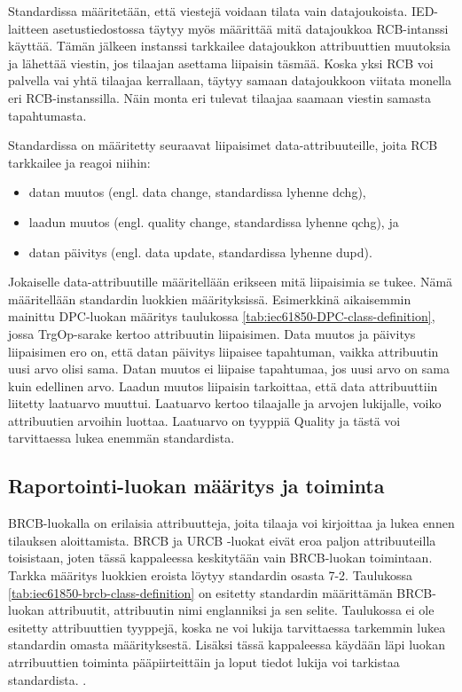 Standardissa määritetään, että viestejä voidaan tilata vain datajoukoista. IED-laitteen asetustiedostossa täytyy myös määrittää mitä datajoukkoa RCB-intanssi käyttää. Tämän jälkeen instanssi tarkkailee datajoukkon attribuuttien muutoksia ja lähettää viestin, jos tilaajan asettama liipaisin täsmää. Koska yksi RCB voi palvella vai yhtä tilaajaa kerrallaan, täytyy samaan datajoukkoon viitata monella eri RCB-instanssilla. Näin monta eri tulevat tilaajaa saamaan viestin samasta tapahtumasta.

Standardissa on määritetty seuraavat liipaisimet data-attribuuteille, joita RCB tarkkailee ja reagoi niihin:
\begin{itemize}
	\item datan muutos (engl. data change, standardissa lyhenne dchg),
	\item laadun muutos (engl. quality change, standardissa lyhenne qchg), ja
	\item datan päivitys (engl. data update, standardissa lyhenne dupd).
\end{itemize}
Jokaiselle data-attribuutille määritellään erikseen mitä liipaisimia se tukee. Nämä määritellään standardin luokkien määrityksissä. Esimerkkinä aikaisemmin mainittu DPC-luokan määritys taulukossa \ref{tab:iec61850-DPC-class-definition}, jossa TrgOp-sarake kertoo attribuutin liipaisimen. Data muutos ja päivitys liipaisimen ero on, että datan päivitys liipaisee tapahtuman, vaikka attribuutin uusi arvo olisi sama. Datan muutos ei liipaise tapahtumaa, jos uusi arvo on sama kuin edellinen arvo. Laadun muutos liipaisin tarkoittaa, että data attribuuttiin liitetty laatuarvo muuttui. Laatuarvo kertoo tilaajalle ja arvojen lukijalle, voiko attribuutien arvoihin luottaa. Laatuarvo on tyyppiä Quality ja tästä voi tarvittaessa lukea enemmän standardista. \cite[s.~90]{IEC61850-7-1}


\subsection{Raportointi-luokan määritys ja toiminta}
\label{rcb-toiminta}
BRCB-luokalla on erilaisia attribuutteja, joita tilaaja voi kirjoittaa ja lukea ennen tilauksen aloittamista. BRCB ja URCB -luokat eivät eroa paljon attribuuteilla toisistaan, joten tässä kappaleessa keskitytään vain BRCB-luokan toimintaan. Tarkka määritys luokkien eroista löytyy standardin osasta 7-2. Taulukossa \ref{tab:iec61850-brcb-class-definition} on esitetty standardin määrittämän BRCB-luokan attribuutit, attribuutin nimi englanniksi ja sen selite. Taulukossa ei ole esitetty attribuuttien tyyppejä, koska ne voi lukija tarvittaessa tarkemmin lukea standardin omasta määrityksestä. Lisäksi tässä kappaleessa käydään läpi luokan atrribuuttien toiminta pääpiirteittäin ja loput tiedot lukija voi tarkistaa standardista. \cite[s.~93--118]{IEC61850-7-2}.

